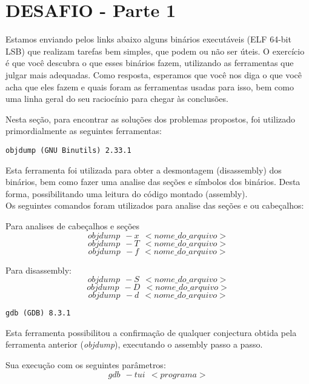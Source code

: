 \section{DESAFIO - Parte 1} \label{sec:desafio1}

Estamos enviando pelos links abaixo alguns binários executáveis (ELF
64-bit LSB) que realizam tarefas bem simples, que podem ou não ser
úteis. O exercício é que você descubra o que esses binários fazem,
utilizando as ferramentas que julgar mais adequadas. Como resposta,
esperamos que você nos diga o que você acha que eles fazem e quais
foram as ferramentas usadas para isso, bem como uma linha geral do seu
raciocínio para chegar às conclusões.\\

\par Nesta seção, para encontrar as soluções dos problemas propostos, foi
utilizado primordialmente as seguintes ferramentas:

\begin{verbatim}
objdump (GNU Binutils) 2.33.1
\end{verbatim}

Esta ferramenta foi utilizada para obter a desmontagem (disassembly)
dos binários, bem como fazer uma analise das seções e símbolos dos
binários. Desta forma, possibilitando uma leitura do código montado
(assembly).\\

Os seguintes comandos foram utilizados para analise das seções e ou
cabeçalhos:

Para analises de cabeçalhos e seções\\
$$objdump \ \ -x \ \ <nome\_do\_arquivo>$$
$$objdump \ \ -T \ \ <nome\_do\_arquivo>$$
$$objdump \ \ -f \ \ <nome\_do\_arquivo>$$

Para disassembly:\\
$$objdump \ \ -S \ \ <nome\_do\_arquivo>$$
$$objdump \ \ -D \ \ <nome\_do\_arquivo>$$
$$objdump \ \ -d \ \ <nome\_do\_arquivo>$$

\begin{verbatim}
gdb (GDB) 8.3.1
\end{verbatim}

Esta ferramenta possibilitou a confirmação de qualquer conjectura obtida pela
ferramenta anterior (\emph{objdump}), executando o assembly passo a passo.

Sua execução com os seguintes parâmetros:
$$gdb \ \ -tui \ \ <programa>$$

